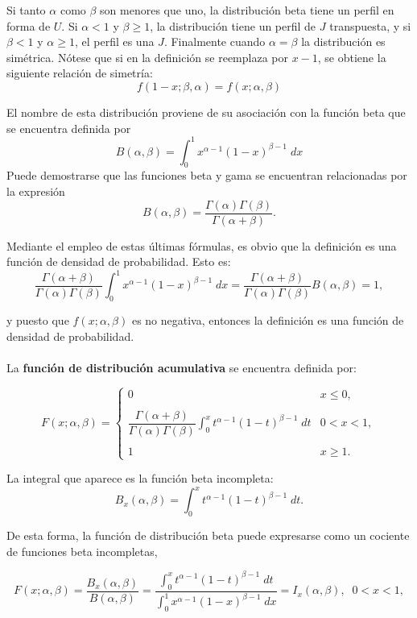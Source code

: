 Si tanto $\alpha$ como $\beta$ son menores que uno, la distribución beta tiene un perfil en forma de $U$. Si $\alpha<1$ y $\beta\geq 1$, la distribución tiene un perfil de $J$ transpuesta, y si $\beta<1$ y $\alpha\geq 1$, el perfil es una $J$. Finalmente cuando $\alpha=\beta$ la distribución es simétrica. Nótese que si en la definición se reemplaza por $x-1$, se obtiene la siguiente relación de simetría:
$$f(1-x;\beta,\alpha) = f(x;\alpha,\beta)$$

El nombre de esta distribución proviene de su asociación con la función beta que se encuentra definida por
$$B(\alpha,\beta) = \int_{0}^{1}x^{\alpha-1}(1-x)^{\beta -1}\; dx$$
Puede demostrarse que las funciones beta y gama se encuentran relacionadas por la expresión
$$B(\alpha,\beta)=\dfrac{\Gamma(\alpha)\Gamma(\beta)}{\Gamma(\alpha+\beta)}.$$

Mediante el empleo de estas últimas fórmulas, es obvio que la definición es una función de densidad de probabilidad. Esto es:
$$\dfrac{\Gamma(\alpha+\beta)}{\Gamma(\alpha)\Gamma(\beta)}\int_0^1x^{\alpha-1}(1-x)^{\beta-1}\; dx = \dfrac{\Gamma(\alpha+\beta)}{\Gamma(\alpha)\Gamma(\beta)} B(\alpha,\beta) = 1,$$

y puesto que $f(x;\alpha,\beta)$ es no negativa, entonces la definición es una función de densidad de probabilidad.\\\\

La \textbf{función de distribución acumulativa} se encuentra definida por:

\begin{tcolorbox}
	\begin{def.}
	$$F(x;\alpha,\beta)=\left\{\begin{array}{ll}
		0 & x\leq 0,\\\\
		\dfrac{\Gamma(\alpha+\beta)}{\Gamma(\alpha)\Gamma(\beta)}\displaystyle\int_0^x t^{\alpha-1}(1-t)^{\beta-1} \; dt & 0<x<1,\\\\
		1&x\geq 1.
	     \end{array}\right.$$
	\end{def.}
\end{tcolorbox}

La integral que aparece es la función beta incompleta:
$$B_x(\alpha,\beta)=\int_0^x t^{\alpha-1}(1-t)^{\beta-1}\; dt.$$

De esta forma, la función de distribución beta puede expresarse como un cociente de funciones beta incompletas,
\begin{tcolorbox}
    $$ F(x;\alpha,\beta)=\dfrac{B_x(\alpha,\beta)}{B(\alpha,\beta)}=\dfrac{\displaystyle\int_0^x t^{\alpha-1}(1-t)^{\beta-1}\; dt}{\displaystyle\int_{0}^{1}x^{\alpha-1}(1-x)^{\beta -1}\; dx}=I_x(\alpha,\beta),\;\; 0<x<1,$$
\end{tcolorbox}


